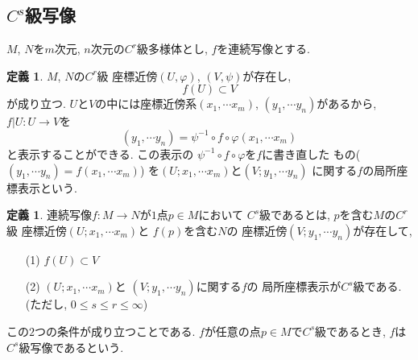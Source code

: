 \documentclass[a4j,12pt]{jarticle}
\theoremstyle{definition}
\newtheorem{definition}[theorem]{定義}
\begin{document}
\subsection{$C^s$級写像}
$M$, $N$を$m$次元, $n$次元の$C^r$級多様体とし, 
$f$を連続写像とする. 
\begin{definition}\label{def:local coordinate display}
$M$, $N$の$C^r$級
座標近傍$(U,\varphi)$, 
$(V,\psi)$が存在し, 
$$f(U)\subset V$$
が成り立つ. 
$U$と$V$の中には座標近傍系$(x_1,\cdots x_m)$, 
$(y_1,\cdots y_n)$があるから, 
$f|U:U\to V$を
$$(y_1,\cdots y_n)=
\psi^{-1} \circ f\circ \varphi(x_1,\cdots x_m)$$
と表示することができる. この表示の
$\psi^{-1} \circ f\circ \varphi$を$f$に書き直した
もの($(y_1,\cdots y_n)=f(x_1,\cdots x_m)$)
を$(U;x_1,\cdots x_m)$と$(V;y_1,\cdots y_n)$
に関する$f$の局所座標表示という. 
\end{definition}
\begin{definition}\label{def:C^s map}
    連続写像$f:M\to N$が$1$点$p\in M$において
    $C^s$級であるとは, $p$を含む$M$の$C^r$級
    座標近傍$(U;x_1,\cdots x_m)$と
    $f(p)$を含む$N$の
    座標近傍$(V;y_1,\cdots y_n)$が存在して, 
    \begin{itemize}
        \item[(1)]$f(U)\subset V$
        \item[(2)]$(U;x_1,\cdots x_m)$と
        $(V;y_1,\cdots y_n)$に関する$f$の
        局所座標表示が$C^s$級である.
        (ただし, $0\leq s \leq r \leq \infty$) 
    \end{itemize}
    この$2$つの条件が成り立つことである. 
    $f$が任意の点$p\in M$で$C^s$級であるとき, 
    $f$は$C^s$級写像であるという. 
\end{definition}
\end{document}
